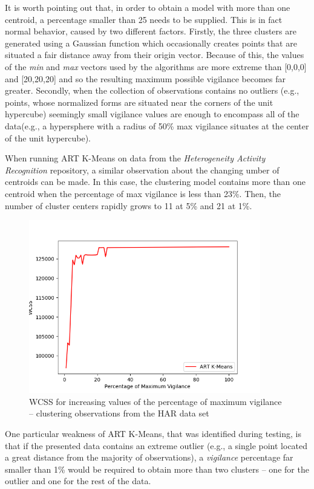 \documentclass{l4proj}
\begin{document}
It is worth pointing out that, in order to obtain a model with more than one centroid, a percentage smaller than 25 needs to be supplied. This is in fact normal behavior, caused by two different factors. Firstly, the three clusters are generated using a Gaussian function which occasionally creates points that are situated a fair distance away from their origin vector. Because of this, the values of the \textit{min} and \textit{max} vectors used by the algorithms are more extreme than [0,0,0] and [20,20,20] and so the resulting maximum possible vigilance becomes far greater. Secondly, when the collection of observations contains no outliers (e.g., points, whose normalized forms are situated near the corners of the unit hypercube) seemingly small vigilance values are enough to encompass all of the data(e.g., a hypersphere with a radius of 50\% max vigilance situates at the center of the unit hypercube).

When running ART K-Means on data from the \textit{Heterogeneity Activity Recognition} repository, a similar observation about the changing umber of centroids can be made. In this case, the clustering model contains more than one centroid when the percentage of max vigilance is less than 23\%. Then, the number of cluster centers rapidly grows to 11 at 5\% and 21 at 1\%.

\begin{figure}[H]
	\centering
    \label{fig:res13}
    \includegraphics[width=0.9\textwidth]{images/result13}
    \caption{WCSS for increasing values of the percentage of maximum vigilance -- clustering observations from the HAR data set} 
\end{figure}

One particular weakness of ART K-Means, that was identified during testing, is that
if the presented data contains an extreme outlier (e.g., a single point located a great distance from the majority of observations), a \textit{vigilance} percentage far smaller than 1\% would be required to obtain more than two clusters -- one for the outlier and one for the rest of the data. 
\end{document}
